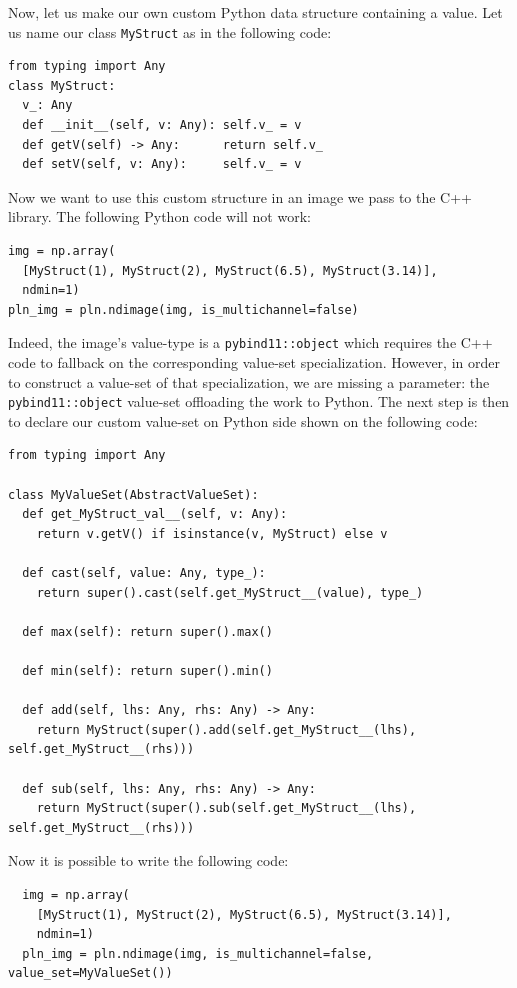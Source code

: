 
Now, let us make our own custom Python data structure containing a value. Let us name our class \texttt{MyStruct} as in
the following code:

\begin{verbatim}
from typing import Any
class MyStruct:
  v_: Any
  def __init__(self, v: Any): self.v_ = v
  def getV(self) -> Any:      return self.v_
  def setV(self, v: Any):     self.v_ = v
\end{verbatim}

Now we want to use this custom structure in an image we pass to the C++ library. The following Python code will not
work:

\begin{verbatim}
img = np.array(
  [MyStruct(1), MyStruct(2), MyStruct(6.5), MyStruct(3.14)],
  ndmin=1)
pln_img = pln.ndimage(img, is_multichannel=false)
\end{verbatim}

Indeed, the image's value-type is a \texttt{pybind11::object} which requires the C++ code to fallback on the
corresponding value-set specialization. However, in order to construct a value-set of that specialization, we are
missing a parameter: the \texttt{pybind11::object} value-set offloading the work to Python. The next step is then to
declare our custom value-set on Python side shown on the following code:

\begin{verbatim}
from typing import Any

class MyValueSet(AbstractValueSet):
  def get_MyStruct_val__(self, v: Any):
    return v.getV() if isinstance(v, MyStruct) else v

  def cast(self, value: Any, type_):
    return super().cast(self.get_MyStruct__(value), type_)

  def max(self): return super().max()

  def min(self): return super().min()

  def add(self, lhs: Any, rhs: Any) -> Any:
    return MyStruct(super().add(self.get_MyStruct__(lhs), self.get_MyStruct__(rhs)))

  def sub(self, lhs: Any, rhs: Any) -> Any:
    return MyStruct(super().sub(self.get_MyStruct__(lhs), self.get_MyStruct__(rhs)))
\end{verbatim}

Now it is possible to write the following code:
\begin{verbatim}
  img = np.array(
    [MyStruct(1), MyStruct(2), MyStruct(6.5), MyStruct(3.14)],
    ndmin=1)
  pln_img = pln.ndimage(img, is_multichannel=false, value_set=MyValueSet())
\end{verbatim}

